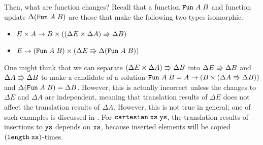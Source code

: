 \documentclass{article}
\theoremstyle{definition}
\begin{document}

Then, what are function changes? Recall that a function $\texttt{Fun} \; A \; B$ and function update $\Delta (\texttt{Fun} \; A \; B)$ are those that make the following two types isomorphic.
\begin{itemize}
 \item \( E \times A \to B \times ((\Delta E \times \Delta A) \Rrightarrow \Delta B) \)
 \item \( E \to (\texttt{Fun} \; A \; B) \times (\Delta E \Rrightarrow \Delta (\texttt{Fun} \; A \; B)) \)
\end{itemize}
One might think that we can separate $(\Delta E \times \Delta A) \Rrightarrow \Delta B$ into $\Delta E \Rrightarrow \Delta B$ and $\Delta A \Rrightarrow \Delta B$ to make a candidate of a solution 
$\texttt{Fun} \; A \; B = A \to (B \times (\Delta A \Rrightarrow \Delta B))$ and 
$\Delta (\texttt{Fun} \; A \; B) = \Delta B$. However, this is actually incorrect unless the changes to $\Delta E$ and $\Delta A$ are independent, meaning that translation results of $\Delta E$ does not affect the translation results of $\Delta A$. However, this is not true in general; one of such examples is  discussed in \citet{GiarrussoRS19}. For $\texttt{cartesian} \; \texttt{xs} \; \texttt{ys}$, the translation results of insertions to $\texttt{ys}$ depends on $\texttt{xs}$, because inserted elements will be copied $(\texttt{length} \; \texttt{xs})$-times.
\end{document}
